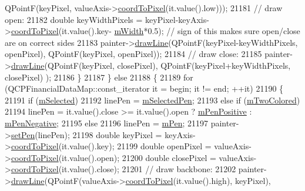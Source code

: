 \begin{DoxyCode}
      QPointF(keyPixel, valueAxis->\hyperlink{class_q_c_p_axis_a985ae693b842fb0422b4390fe36d299a}{coordToPixel}(it.value().low)));
21181       \textcolor{comment}{// draw open:}
21182       \textcolor{keywordtype}{double} keyWidthPixels = keyPixel-keyAxis->\hyperlink{class_q_c_p_axis_a985ae693b842fb0422b4390fe36d299a}{coordToPixel}(it.value().key-
      \hyperlink{class_q_c_p_financial_af630e5eb8485146b9c777e63fd1cf993}{mWidth}*0.5); \textcolor{comment}{// sign of this makes sure open/close are on correct sides}
21183       painter->\hyperlink{class_q_c_p_painter_a0b4b1b9bd495e182c731774dc800e6e0}{drawLine}(QPointF(keyPixel-keyWidthPixels, openPixel), QPointF(keyPixel, openPixel));
21184       \textcolor{comment}{// draw close:}
21185       painter->\hyperlink{class_q_c_p_painter_a0b4b1b9bd495e182c731774dc800e6e0}{drawLine}(QPointF(keyPixel, closePixel), QPointF(keyPixel+keyWidthPixels, closePixel)
      );
21186     \}
21187   \} \textcolor{keywordflow}{else}
21188   \{
21189     \textcolor{keywordflow}{for} (QCPFinancialDataMap::const\_iterator it = begin; it != end; ++it)
21190     \{
21191       \textcolor{keywordflow}{if} (\hyperlink{class_q_c_p_abstract_plottable_a43f68a0603e9bcd016bdfa6d9d5c41c9}{mSelected})
21192         linePen = \hyperlink{class_q_c_p_abstract_plottable_a10619472f5d5e10e9519a599f1cf5576}{mSelectedPen};
21193       \textcolor{keywordflow}{else} \textcolor{keywordflow}{if} (\hyperlink{class_q_c_p_financial_a6afe919190b884d9bac026cefcc8c0a8}{mTwoColored})
21194         linePen = it.value().close >= it.value().open ? \hyperlink{class_q_c_p_financial_aa6599186f417ba615caebb3f6c762bd8}{mPenPositive} : 
      \hyperlink{class_q_c_p_financial_a263fbfefde2cc19c8d4024a8319c2bbb}{mPenNegative};
21195       \textcolor{keywordflow}{else}
21196         linePen = \hyperlink{class_q_c_p_abstract_plottable_a67bc0622fd1b9fa14e54c14922dcec66}{mPen};
21197       painter->\hyperlink{class_q_c_p_painter_af9c7a4cd1791403901f8c5b82a150195}{setPen}(linePen);
21198       \textcolor{keywordtype}{double} keyPixel = keyAxis->\hyperlink{class_q_c_p_axis_a985ae693b842fb0422b4390fe36d299a}{coordToPixel}(it.value().key);
21199       \textcolor{keywordtype}{double} openPixel = valueAxis->\hyperlink{class_q_c_p_axis_a985ae693b842fb0422b4390fe36d299a}{coordToPixel}(it.value().open);
21200       \textcolor{keywordtype}{double} closePixel = valueAxis->\hyperlink{class_q_c_p_axis_a985ae693b842fb0422b4390fe36d299a}{coordToPixel}(it.value().close);
21201       \textcolor{comment}{// draw backbone:}
21202       painter->\hyperlink{class_q_c_p_painter_a0b4b1b9bd495e182c731774dc800e6e0}{drawLine}(QPointF(valueAxis->\hyperlink{class_q_c_p_axis_a985ae693b842fb0422b4390fe36d299a}{coordToPixel}(it.value().high), keyPixel), 

\end{DoxyCode}
